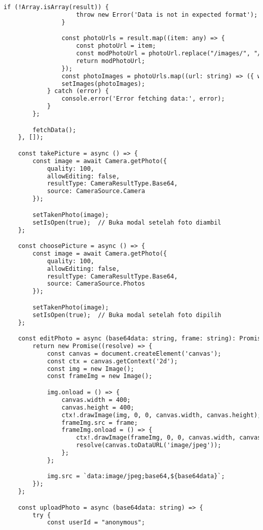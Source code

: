 \begin{lstlisting}[language=HTML, caption=teammate\_photos.tsx]
                if (!Array.isArray(result)) {
                    throw new Error('Data is not in expected format');
                }

                const photoUrls = result.map((item: any) => {
                    const photoUrl = item;
                    const modPhotoUrl = photoUrl.replace("/images/", "/");
                    return modPhotoUrl;
                });
                const photoImages = photoUrls.map((url: string) => ({ webviewPath: url }));
                setImages(photoImages);
            } catch (error) {
                console.error('Error fetching data:', error);
            }
        };

        fetchData();
    }, []);

    const takePicture = async () => {
        const image = await Camera.getPhoto({
            quality: 100,
            allowEditing: false,
            resultType: CameraResultType.Base64,
            source: CameraSource.Camera
        });

        setTakenPhoto(image);
        setIsOpen(true);  // Buka modal setelah foto diambil
    };

    const choosePicture = async () => {
        const image = await Camera.getPhoto({
            quality: 100,
            allowEditing: false,
            resultType: CameraResultType.Base64,
            source: CameraSource.Photos
        });

        setTakenPhoto(image);
        setIsOpen(true);  // Buka modal setelah foto dipilih
    };

    const editPhoto = async (base64data: string, frame: string): Promise<string> => {
        return new Promise((resolve) => {
            const canvas = document.createElement('canvas');
            const ctx = canvas.getContext('2d');
            const img = new Image();
            const frameImg = new Image();

            img.onload = () => {
                canvas.width = 400;
                canvas.height = 400;
                ctx!.drawImage(img, 0, 0, canvas.width, canvas.height);
                frameImg.src = frame;
                frameImg.onload = () => {
                    ctx!.drawImage(frameImg, 0, 0, canvas.width, canvas.height);
                    resolve(canvas.toDataURL('image/jpeg'));
                };
            };

            img.src = `data:image/jpeg;base64,${base64data}`;
        });
    };

    const uploadPhoto = async (base64data: string) => {
        try {
            const userId = "anonymous";


\end{lstlisting}
